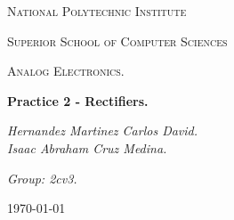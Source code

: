 \begin{titlepage}
	\centering
	{ \huge \scshape National Polytechnic Institute\par}
	{ \Large \scshape  Superior School of Computer Sciences\par }
	\vspace{1cm}
	{\scshape\Large Analog Electronics.\par}
	\vspace{1.5cm}
	{\Huge\bfseries Practice 2 - Rectifiers.\par}
	\vspace{2cm}
	{\Large\itshape Hernandez Martinez Carlos David. \\ Isaac Abraham Cruz Medina. \par}
	{\Large\itshape Group: 2cv3. \par}
	\vfill
	{\large \today\par} 
	\vfill
\end{titlepage}


\tableofcontents 
{}
\pagebreak
